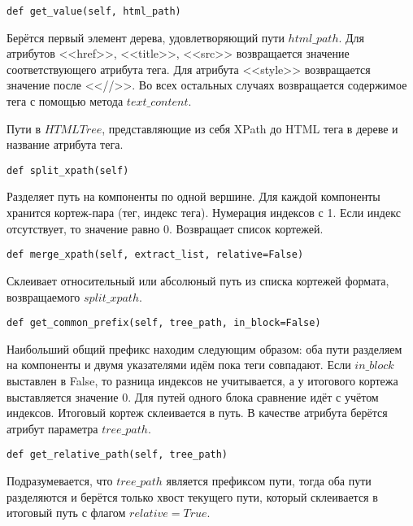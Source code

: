 \begin{lstlisting}
def get_value(self, html_path)
\end{lstlisting}
Берётся первый элемент дерева, удовлетворяющий пути $html\_path$. Для атрибутов <<href>>, <<title>>, <<src>> возвращается значение соответствующего атрибута тега. Для атрибута <<style>> возвращается значение после <<//>>. Во всех остальных случаях возвращается содержимое тега с помощью метода $text\_content$.
\\


Пути в $HTMLTree$, представляющие из себя XPath до HTML тега в дереве и название атрибута тега.
\\

\begin{lstlisting}
def split_xpath(self)
\end{lstlisting}
Разделяет путь на компоненты по одной вершине. Для каждой компоненты хранится кортеж-пара (тег, индекс тега). Нумерация индексов с 1. Если индекс отсутствует, то значение равно 0. Возвращает список кортежей.
\\

\begin{lstlisting}
def merge_xpath(self, extract_list, relative=False)
\end{lstlisting}
Склеивает относительный или абсолюный путь из списка кортежей формата, возвращаемого $split\_xpath$.
\\

\begin{lstlisting}
def get_common_prefix(self, tree_path, in_block=False)
\end{lstlisting}
Наибольший общий префикс находим следующим образом: оба пути разделяем на компоненты и двумя указателями идём пока теги совпадают. Если $in\_block$ выставлен в False, то разница индексов не учитывается, а у итогового кортежа выставляется значение 0. Для путей одного блока сравнение идёт с учётом индексов. Итоговый кортеж склеивается в путь. В качестве атрибута берётся атрибут параметра $tree\_path$.
\\

\begin{lstlisting}
def get_relative_path(self, tree_path)
\end{lstlisting}
Подразумевается, что $tree\_path$ является префиксом пути, тогда оба пути разделяются и берётся только хвост текущего пути, который склеивается в итоговый путь с флагом $relative=True$.
\\

